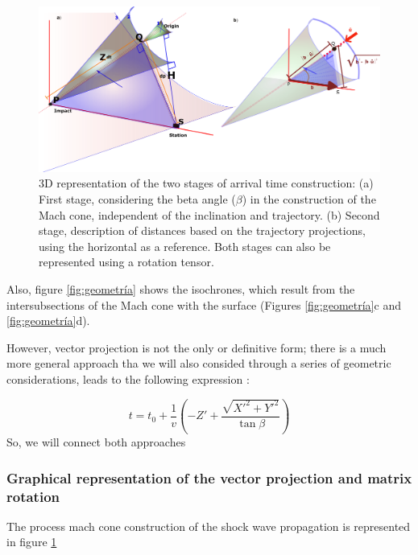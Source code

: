\documentclass[linenum]{SSA-SRL}
\begin{document}
\begin{flushleft}
\begin{figure}[t] %
    \centering
    \includegraphics[width=1\textwidth]{version3Dnueva.png} %
    \caption{3D representation of the two stages of arrival time construction: 
(a) First stage, considering the beta angle ($\beta$) in the construction of the Mach cone, independent of the inclination and trajectory. 
(b) Second stage, description of distances based on the trajectory projections, using the horizontal as a reference. 
Both stages can also be represented using a rotation tensor.}
    \label{fig:3dpujol} %
\end{figure}
Also, figure \ref{fig:geometría} shows the isochrones, which result from the intersubsections of the Mach cone with the surface (Figures \ref{fig:geometría}c and \ref{fig:geometría}d). 

However, vector projection is not the only or definitive form; there is a much more general approach tha we will also consided through a series of geometric considerations, leads to the following expression \cite{Ishihara_2004}:

\begin{equation}
t = t_0 + \frac{1}{v} \left( -Z' + \frac{\sqrt{X'^2 + Y'^2}}{\tan\beta} \right)
\end{equation}
So, we will connect both approaches  


\subsubsection{Graphical representation of the vector projection and matrix rotation}

The process mach cone construction of the shock wave propagation is represented in figure \ref{fig:3dpujol}


\end{flushleft}
\end{document}
